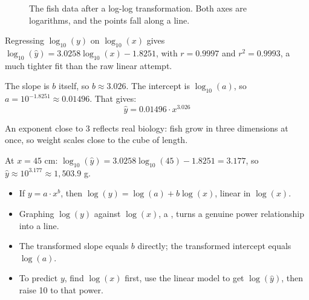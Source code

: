 \begin{figure}[H]
    \centering
    \caption{The fish data after a log-log transformation. Both axes are logarithms, and the points fall along a line.}
    \label{fig:fishLog}
\end{figure}

Regressing $\log_{10}(y)$ on $\log_{10}(x)$ gives $\log_{10}(\hat{y}) = 3.0258\log_{10}(x) - 1.8251$, with $r = 0.9997$ and $r^2 = 0.9993$, a much tighter fit than the raw linear attempt.

The slope is $b$ itself, so $b \approx 3.026$. The intercept is $\log_{10}(a)$, so $a = 10^{-1.8251} \approx 0.01496$. That gives:
\[
\hat{y} = 0.01496 \cdot x^{3.026}
\]

An exponent close to 3 reflects real biology: fish grow in three dimensions at once, so weight scales close to the cube of length.

At $x = 45$ cm: $\log_{10}(\hat{y}) = 3.0258\log_{10}(45) - 1.8251 = 3.177$, so $\hat{y} \approx 10^{3.177} \approx 1{,}503.9$ g.

\begin{itemize}
    \item If $y = a \cdot x^b$, then $\log(y) = \log(a) + b\log(x)$, linear in $\log(x)$.
    \item Graphing $\log(y)$ against $\log(x)$, a , turns a genuine power relationship into a line.
    \item The transformed slope equals $b$ directly; the transformed intercept equals $\log(a)$.
    \item To predict $y$, find $\log(x)$ first, use the linear model to get $\log(\hat{y})$, then raise 10 to that power.
\end{itemize}

